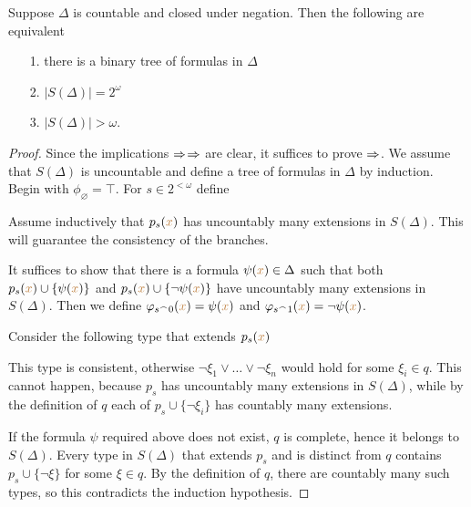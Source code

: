 \begin{lemma}\label{lem_bin_tree}
Suppose $\Delta$ is countable and closed under negation.
Then the following are equivalent\nobreak
\begin{itemize}   
\item[1.] there is a binary tree of formulas in $\Delta$
\item[2.] $\big|S(\Delta)\big|=2^\omega$
\item[3.] $\big|S(\Delta)\big|>\omega$.
\end{itemize}
\end{lemma}
\begin{proof}
Since the implications $\Rightarrow$$\Rightarrow$ are clear, it
suffices to prove $\Rightarrow$.
We assume that $S(\Delta)$ is uncountable and define a tree of
formulas in $\Delta$ by induction.
Begin with $\phi_\varnothing=\top$.
For $s\in 2^{<\omega}$ define


Assume inductively that $p_s({\color{brown} x})$ has uncountably many extensions in $S(\Delta)$.
This will guarantee the consistency of the branches.

It suffices to show that there is a formula $\psi({\color{brown} x})\in\Delta$ such that
both $p_s({\color{brown} x})\cup\{\psi({\color{brown} x})\}$ and $p_s({\color{brown} x})\cup\{\neg\psi({\color{brown} x})\}$ have uncountably many
extensions in $S(\Delta)$.
Then we define $\varphi_{s^\frown0}({\color{brown} x})=\psi({\color{brown} x})$ and $\varphi_{s^\frown1}({\color{brown} x})=\neg\psi({\color{brown} x})$.

Consider the following type that extends $p_s({\color{brown} x})$


This type is consistent, otherwise $\neg\xi_1\vee\dots\vee\neg\xi_n$
would hold for some $\xi_i \in q$.
This cannot happen, because $p_s$ has uncountably many extensions in
$S(\Delta)$, while by the definition of $q$ each of
$p_s\cup\{\neg\xi_i\}$ has countably many extensions.

If the formula $\psi$ required above does not exist, $q$ is complete,
hence it belongs to $S(\Delta)$.
Every type in $S(\Delta)$ that extends $p_s$ and is distinct from $q$
contains $p_s\cup\{\neg\xi\}$ for some $\xi\in q$.
By the definition of $q$, there are countably many such types,
so this contradicts the induction hypothesis.
\end{proof}


